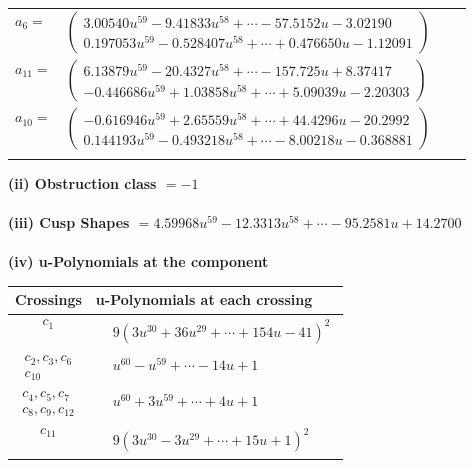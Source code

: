 \documentclass[1p]{elsarticle_modified}
\theoremstyle{definition}
\begin{document}
\begin{tabular}{m{7pt} m{180pt} m{7pt} m{180pt} }
\flushright $a_{6}=$&$\begin{pmatrix}3.00540 u^{59}-9.41833 u^{58}+\cdots-57.5152 u-3.02190\\0.197053 u^{59}-0.528407 u^{58}+\cdots+0.476650 u-1.12091\end{pmatrix}$ \\
\flushright $a_{11}=$&$\begin{pmatrix}6.13879 u^{59}-20.4327 u^{58}+\cdots-157.725 u+8.37417\\-0.446686 u^{59}+1.03858 u^{58}+\cdots+5.09039 u-2.20303\end{pmatrix}$ \\
\flushright $a_{10}=$&$\begin{pmatrix}-0.616946 u^{59}+2.65559 u^{58}+\cdots+44.4296 u-20.2992\\0.144193 u^{59}-0.493218 u^{58}+\cdots-8.00218 u-0.368881\end{pmatrix}$\\&\end{tabular}
\flushleft \textbf{(ii) Obstruction class $= -1$}\\~\\
\flushleft \textbf{(iii) Cusp Shapes $= 4.59968 u^{59}-12.3313 u^{58}+\cdots-95.2581 u+14.2700$}\\~\\
\newpage\renewcommand{\arraystretch}{1}
\flushleft \textbf{(iv) u-Polynomials at the component}\newline \\
\begin{tabular}{m{50pt}|m{274pt}}
Crossings & \hspace{64pt}u-Polynomials at each crossing \\
\hline $$\begin{aligned}c_{1}\end{aligned}$$&$\begin{aligned}
&9(3 u^{30}+36 u^{29}+\cdots+154 u-41)^{2}
\end{aligned}$\\
\hline $$\begin{aligned}c_{2},c_{3},c_{6}\\c_{10}\end{aligned}$$&$\begin{aligned}
&u^{60}- u^{59}+\cdots-14 u+1
\end{aligned}$\\
\hline $$\begin{aligned}c_{4},c_{5},c_{7}\\c_{8},c_{9},c_{12}\end{aligned}$$&$\begin{aligned}
&u^{60}+3 u^{59}+\cdots+4 u+1
\end{aligned}$\\
\hline $$\begin{aligned}c_{11}\end{aligned}$$&$\begin{aligned}
&9(3 u^{30}-3 u^{29}+\cdots+15 u+1)^{2}
\end{aligned}$\\
\hline
\end{tabular}\\~\\
\end{document}
